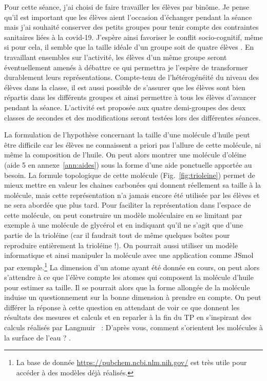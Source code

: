 \documentclass[12pt,a4paper]{article}
\begin{document}
Pour cette séance, j'ai choisi de faire travailler les élèves par binôme.
Je pense qu'il est important que les élèves aient l'occasion d'échanger pendant la séance mais j'ai souhaité conserver des petits groupes pour tenir compte des contraintes sanitaires liées à la covid-19.
J'espère ainsi favoriser le conflit socio-cognitif, même si pour cela, il semble que la taille idéale d'un groupe soit de quatre élèves \cite{Courtillot2006}.
En travaillant ensembles sur l'activité, les élèves d'un même groupe seront éventuellement amenés à débattre ce qui permettra je l'espère de transformer durablement leurs représentations.
Compte-tenu de l'hétérogénéité du niveau des élèves dans la classe, il est aussi possible de s'assurer que les élèves sont bien répartis dans les différents groupes et ainsi permettre à tous les élèves d'avancer pendant la séance.
L'activité est proposée aux quatre demi-groupes des deux classes de secondes et des modifications seront testées lors des différentes séances.

La formulation de l'hypothèse concernant la taille d'une molécule d'huile peut être difficile car les élèves ne connaissent a priori pas l'allure de cette molécule, ni même la composition de l'huile.
On peut alors montrer une molécule d'oléine (aide 5 en annexe~\ref{ann:aides}) sous la forme d'une aide ponctuelle apportée au besoin.
La formule topologique de cette molécule (Fig.~\ref{fig:trioleine}) permet de mieux mettre en valeur les chaines carbonées qui donnent réellement sa taille à la molécule, mais cette représentation n'a jamais encore été utilisée par les élèves et ne sera abordée que plus tard.
Pour faciliter la représentation dans l'espace de cette molécule, on peut construire un modèle moléculaire en se limitant par exemple à une molécule de glycérol et en indiquant qu'il ne s'agit que d'une partie de la trioléine (car il faudrait tout de même quelques boîtes pour reproduire entièrement la trioléine !).
On pourrait aussi utiliser un modèle informatique et ainsi \og manipuler \fg{} la molécule avec une application comme JSmol par exemple.\footnote{La base de donnée \href{https://pubchem.ncbi.nlm.nih.gov/}{https://pubchem.ncbi.nlm.nih.gov/} est très utile pour accéder à des modèles déjà réalisés.}
La dimension d'un atome ayant été donnée en cours, on peut alors s'attendre à ce que l'élève compte les atomes qui composent la \og molécule d'huile \fg{} pour estimer sa taille.
Il se pourrait alors que la forme allongée de la molécule induise un questionnement sur la bonne dimension à prendre en compte.
On peut différer la réponse à cette question en attendant de voir ce que donnent les résultats des mesures et calculs et en reparler à la fin du TP en s'inspirant des calculs réalisés par Langmuir~\cite{Langmuir1917} : \og D'après vous, comment s'orientent les molécules à la surface de l'eau ? \fg{}.
\end{document}
